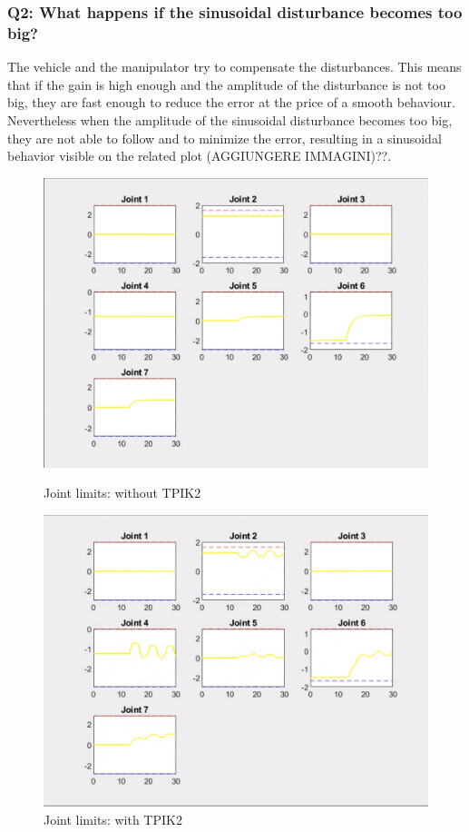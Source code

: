 \documentclass{article}
\begin{document}
\subsubsection{Q2: What happens if the sinusoidal disturbance becomes too big?}
The vehicle and the manipulator try to compensate the disturbances. This means that if the gain is high enough and the amplitude of the disturbance is not too big, they are fast enough to reduce the error at the price of a smooth behaviour. Nevertheless when the amplitude of the sinusoidal disturbance becomes too big, they are not able to follow and to minimize the error, resulting in a sinusoidal behavior visible on the related plot (AGGIUNGERE IMMAGINI)??.
\begin{figure}[htpb] 
\begin{minipage}{0.40\textwidth} 
\includegraphics[width=\textwidth]{522_1_wout_TPIK2.png} 
\caption[Joint limits: without TPIK2]{Joint limits: without TPIK2}\label{JL_wout_TPIK2} 
\end{minipage} 
\hspace{0.2\textwidth} 
\begin{minipage}{0.40\textwidth}  
\includegraphics[width=\textwidth]{522_1_w_TPIK2.png}
\caption[Joint limits: with TPIK2]{Joint limits: with TPIK2}\label{JL_w_TPIK2} 
\end{minipage}  
\end{figure}
\end{document}
